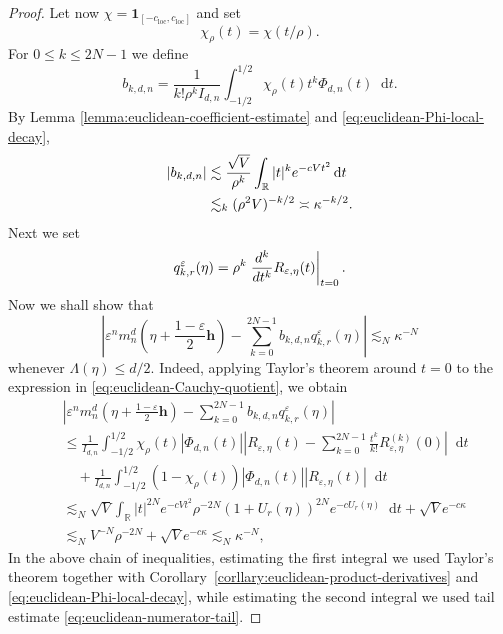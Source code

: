 \documentclass{article}
\newcommand{\R}{\mathbb R}
\newcommand{\dd}{\mathop{}\!\mathrm{d}}
\newcommand{\one}{\mathbf{1}}
\theoremstyle{plain}
\numberwithin{equation}{section}
\begin{document}
\begin{proof}
Let now $\chi=\one_{[-c_{\mathrm{loc}},c_{\mathrm{loc}}]}$ and set
\[
 \chi_\rho(t)=\chi(t/\rho).
\]
For \(0\leq k\leq2N-1\) we define
\[
 b_{k,d,n}
 =
 \frac1{k!\rho^kI_{d,n}}
 \int_{-1/2}^{1/2}
 \chi_\rho(t)t^k\Phi_{d,n}(t)\dd t.
\]
By Lemma \ref{lemma:euclidean-coefficient-estimate} and
\eqref{eq:euclidean-Phi-local-decay},
\begin{align}
 |b_{k,d,n}|
 &\lesssim
 \frac{\sqrt V}{\rho^k}
 \int_{\mathbb R}|t|^ke^{-cVt^2}\dd t \notag\\
 &\lesssim_k (\rho^2V)^{-k/2}
 \asymp\kappa^{-k/2}.
 \label{eq:euclidean-b-bound}
\end{align}
Next we set
\begin{equation}
     q_{k,r}^{\varepsilon}(\eta)
 =
 \rho^k
 \left.
 \frac{d^k}{d t ^k}R_{\varepsilon,\eta}(t)
 \right|_{t=0}. \label{eq:definition of q_{k,r}}
\end{equation}
Now we shall show that
\begin{equation}\label{eq:euclidean-one-branch-expansion}
 \left|
 \varepsilon^n
 m_n^d\left(\eta+\frac{1-\varepsilon}{2}\mathbf h\right)
 -
 \sum_{k=0}^{2N-1}
 b_{k,d,n}q_{k,r}^{\varepsilon}(\eta)
 \right|
 \lesssim_N \kappa^{-N}
\end{equation}
whenever \(\Lambda(\eta)\leq d/2\).
Indeed, applying Taylor's theorem around \(t=0\) to the expression in
\eqref{eq:euclidean-Cauchy-quotient}, we obtain
\begin{align*} &\left|
 \varepsilon^n
 m_n^d\left(\eta+\frac{1-\varepsilon}{2}\mathbf h\right)
 -
 \sum_{k=0}^{2N-1}
 b_{k,d,n}q_{k,r}^{\varepsilon}(\eta)
 \right| \\
 &\le\frac1{I_{d,n}}\int_{-1/2}^{1/2}\chi_\rho(t)|\Phi_{d,n}(t)|
 \left|R_{\varepsilon,\eta}(t)
 -\sum_{k=0}^{2N-1}\frac{t^k}{k!}R_{\varepsilon,\eta}^{(k)}(0)\right|\dd t\\
 &\quad+\frac1{I_{d,n}}\int_{-1/2}^{1/2}(1-\chi_\rho(t))
 |\Phi_{d,n}(t)||R_{\varepsilon,\eta}(t)|\dd t \\
 &\lesssim_N \sqrt{V} \int_{\R} |t|^{2N} e^{-cVt^2} \rho^{-2N} (1+U_r(\eta))^{2N} e^{-cU_r(\eta)} \dd t + \sqrt{V} e^{-c \kappa} \\
 &\lesssim_N V^{-N} \rho^{-2N}+ \sqrt{V} e^{-c \kappa} \lesssim_N \kappa^{-N},
\end{align*}
In the above chain of inequalities, estimating the first integral we used Taylor's theorem together with
Corollary~\ref{corllary:euclidean-product-derivatives} and
\eqref{eq:euclidean-Phi-local-decay}, while estimating the second integral we used
tail estimate \eqref{eq:euclidean-numerator-tail}.

\end{proof}
\end{document}
